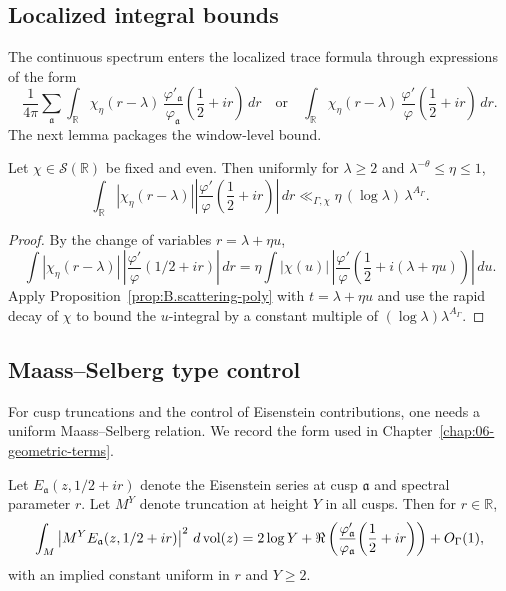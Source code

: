 \subsection{Localized integral bounds}
\label{subsec:B.scattering-local}

The continuous spectrum enters the localized trace formula through expressions of the form
\[
\frac{1}{4\pi}\sum_{\mathfrak{a}}\int_{\mathbb{R}}
\chi_\eta(r-\lambda)\,\frac{\varphi'_{\mathfrak{a}}}{\varphi_{\mathfrak{a}}}\!\left(\frac12+ir\right)\,dr
\quad\text{or}\quad
\int_{\mathbb{R}}\chi_\eta(r-\lambda)\,\frac{\varphi'}{\varphi}\!\left(\frac12+ir\right)\,dr.
\]
The next lemma packages the window-level bound.

\begin{lemma}
\label{lem:B.scattering-window}
Let $\chi\in\mathcal{S}(\mathbb{R})$ be fixed and even.  Then uniformly for $\lambda\ge 2$ and
$\lambda^{-\theta}\le \eta\le 1$,
\begin{equation}
\label{eq:B.scattering-window}
\int_{\mathbb{R}}
\left|\chi_\eta(r-\lambda)\right|
\left|\frac{\varphi'}{\varphi}\!\left(\frac12+ir\right)\right|\,dr
\ll_{\Gamma,\chi}
\eta\,(\log \lambda)\,\lambda^{A_\Gamma}.
\end{equation}
\end{lemma}

\begin{proof}
By the change of variables $r=\lambda+\eta u$,
\[
\int |\chi_\eta(r-\lambda)|\,\left|\frac{\varphi'}{\varphi}(1/2+ir)\right|\,dr
=
\eta\int |\chi(u)|\,\left|\frac{\varphi'}{\varphi}\!\left(\frac12+i(\lambda+\eta u)\right)\right|\,du.
\]
Apply Proposition~\ref{prop:B.scattering-poly} with $t=\lambda+\eta u$ and use the rapid decay of $\chi$ to bound the
$u$-integral by a constant multiple of $(\log\lambda)\lambda^{A_\Gamma}$.
\end{proof}

\subsection{Maass--Selberg type control}
\label{subsec:B.maass-selberg}

For cusp truncations and the control of Eisenstein contributions, one needs a uniform Maass--Selberg relation.
We record the form used in Chapter~\ref{chap:06-geometric-terms}.

\begin{proposition}
\label{prop:B.maass-selberg}
Let $E_{\mathfrak{a}}(z,1/2+ir)$ denote the Eisenstein series at cusp $\mathfrak{a}$ and spectral parameter $r$.
Let $M^Y$ denote truncation at height $Y$ in all cusps.  Then for $r\in\mathbb{R}$,
\begin{equation}
\label{eq:B.maass-selberg}
\int_{M} \left|M^Y E_{\mathfrak{a}}(z,1/2+ir)\right|^2\,d\mathop{\mathrm{vol}}\nolimits(z)
=
2\log Y
+
\Re\left(\frac{\varphi'_{\mathfrak{a}}}{\varphi_{\mathfrak{a}}}\!\left(\frac12+ir\right)\right)
+
O_\Gamma(1),
\end{equation}
with an implied constant uniform in $r$ and $Y\ge 2$.
\end{proposition}

